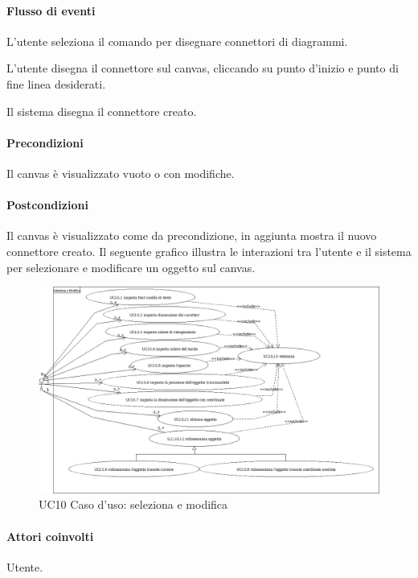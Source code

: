 \paragraph{Flusso di eventi}
\begin{elenconumerato}[\textbf{}]{\subsubsecindent}
\item L'utente seleziona il comando per disegnare connettori di diagrammi.
\item L'utente disegna il connettore sul canvas, cliccando su punto d'inizio e punto di fine linea desiderati.
\item Il sistema disegna il connettore creato.
\end{elenconumerato}
\paragraph{Precondizioni} Il canvas \`e visualizzato vuoto o con modifiche.
\paragraph{Postcondizioni} Il canvas \`e visualizzato come da precondizione, in aggiunta mostra il nuovo connettore creato.
\newpage
{}
\label{ucselezionaemodifica}
Il seguente grafico illustra le interazioni tra l'utente e il sistema per selezionare e modificare un oggetto sul canvas.

\begin{figure}[!ht]
\centering
\vspace{20pt} 
\includegraphics{UC10Espanso.jpg}
\caption{UC10 Caso d'uso: seleziona e modifica}
\label{uc10}
\end{figure}
\newpage
{}
\paragraph{Attori coinvolti} Utente.
